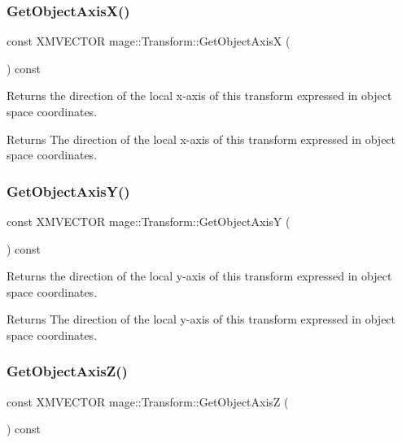 \subsubsection{\texorpdfstring{Get\+Object\+Axis\+X()}{GetObjectAxisX()}}
{\footnotesize\ttfamily const X\+M\+V\+E\+C\+T\+OR mage\+::\+Transform\+::\+Get\+Object\+AxisX (\begin{DoxyParamCaption}{ }\end{DoxyParamCaption}) const\hspace{0.3cm}{\ttfamily [noexcept]}}

Returns the direction of the local x-\/axis of this transform expressed in object space coordinates.

\begin{DoxyReturn}{Returns}
The direction of the local x-\/axis of this transform expressed in object space coordinates. 
\end{DoxyReturn}
\hypertarget{classmage_1_1_transform_a8638ea8b26dcd32508c267151c3adcfe}{}\label{classmage_1_1_transform_a8638ea8b26dcd32508c267151c3adcfe} 
\subsubsection{\texorpdfstring{Get\+Object\+Axis\+Y()}{GetObjectAxisY()}}
{\footnotesize\ttfamily const X\+M\+V\+E\+C\+T\+OR mage\+::\+Transform\+::\+Get\+Object\+AxisY (\begin{DoxyParamCaption}{ }\end{DoxyParamCaption}) const\hspace{0.3cm}{\ttfamily [noexcept]}}

Returns the direction of the local y-\/axis of this transform expressed in object space coordinates.

\begin{DoxyReturn}{Returns}
The direction of the local y-\/axis of this transform expressed in object space coordinates. 
\end{DoxyReturn}
\hypertarget{classmage_1_1_transform_a0f1249835596278a430c63d74a86906a}{}\label{classmage_1_1_transform_a0f1249835596278a430c63d74a86906a} 
\subsubsection{\texorpdfstring{Get\+Object\+Axis\+Z()}{GetObjectAxisZ()}}
{\footnotesize\ttfamily const X\+M\+V\+E\+C\+T\+OR mage\+::\+Transform\+::\+Get\+Object\+AxisZ (\begin{DoxyParamCaption}{ }\end{DoxyParamCaption}) const\hspace{0.3cm}{\ttfamily [noexcept]}}

